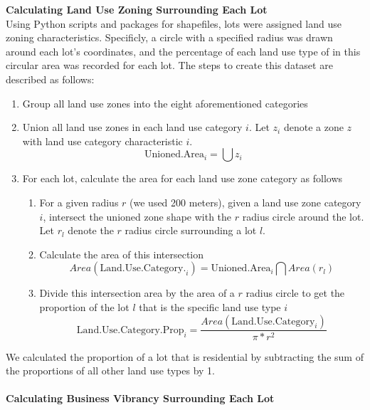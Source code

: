\documentclass{article}
\begin{document}
\textbf{Calculating Land Use Zoning Surrounding Each Lot}\\
Using Python scripts and packages for shapefiles, lots were assigned land use zoning characteristics. Specificly, a circle with a specified radius was drawn around each lot's coordinates, and the percentage of each land use type of in this circular area was recorded for each lot. The steps to create this dataset are described as follows:
\begin{enumerate}
    \item Group all land use zones into the eight aforementioned categories
    \item Union all land use zones in each land use category $i$. Let $z_i$ denote a zone $z$ with land use category characteristic $i$.
        \begin{equation}
            \text{Unioned.Area}_i =  \bigcup{z_i}
        \end{equation}
    \item For each lot, calculate the area for each land use zone category as follows
        \begin{enumerate}
            \item For a given radius $r$ (we used 200 meters), given a land use zone category $i$, intersect the unioned zone shape with the $r$ radius circle around the lot. Let $r_l$ denote the $r$ radius circle surrounding a lot $l$.
            \item Calculate the area of this intersection
            \begin{equation}
                Area(\text{Land.Use.Category.}_i) =  \text{Unioned.Area}_i \bigcap Area(r_l)
            \end{equation}
            \item Divide this intersection area by the area of a $r$ radius circle to get the proportion of the lot $l$ that is the specific land use type $i$
            \begin{equation}
                \text{Land.Use.Category.Prop}_i = \frac{Area(\text{Land.Use.Category}_i)}{\pi * r^2}
            \end{equation}
        \end{enumerate}
\end{enumerate}
We calculated the proportion of a lot that is residential by subtracting the sum of the proportions of all other land use types by 1.\\\\
\textbf{Calculating Business Vibrancy Surrounding Each Lot}\\
\end{document}
